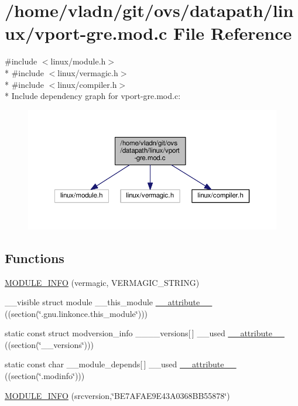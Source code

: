 \hypertarget{vport-gre_8mod_8c}{}\section{/home/vladn/git/ovs/datapath/linux/vport-\/gre.mod.\+c File Reference}
\label{vport-gre_8mod_8c}
{\ttfamily \#include $<$linux/module.\+h$>$}\\*
{\ttfamily \#include $<$linux/vermagic.\+h$>$}\\*
{\ttfamily \#include $<$linux/compiler.\+h$>$}\\*
Include dependency graph for vport-\/gre.mod.\+c\+:
\nopagebreak
\begin{figure}[H]
\begin{center}
\leavevmode
\includegraphics[width=350pt]{vport-gre_8mod_8c__incl}
\end{center}
\end{figure}
\subsection*{Functions}
\begin{DoxyCompactItemize}
\item 
\hyperlink{vport-gre_8mod_8c_a59ae061e50f755cbc9dbde3c6688273a}{M\+O\+D\+U\+L\+E\+\_\+\+I\+N\+F\+O} (vermagic, V\+E\+R\+M\+A\+G\+I\+C\+\_\+\+S\+T\+R\+I\+N\+G)
\item 
\+\_\+\+\_\+visible struct module \+\_\+\+\_\+this\+\_\+module \hyperlink{vport-gre_8mod_8c_acc22bca8fb9ed0433181b5c98efdb5a4}{\+\_\+\+\_\+attribute\+\_\+\+\_\+} ((section(\char`\"{}.gnu.\+linkonce.\+this\+\_\+module\char`\"{})))
\item 
static const struct modversion\+\_\+info \+\_\+\+\_\+\+\_\+\+\_\+versions\mbox{[}$\,$\mbox{]} \+\_\+\+\_\+used \hyperlink{vport-gre_8mod_8c_a3457b560a580904370cd8cbaddb0c902}{\+\_\+\+\_\+attribute\+\_\+\+\_\+} ((section(\char`\"{}\+\_\+\+\_\+versions\char`\"{})))
\item 
static const char \+\_\+\+\_\+module\+\_\+depends\mbox{[}$\,$\mbox{]} \+\_\+\+\_\+used \hyperlink{vport-gre_8mod_8c_aebedc6dfadccd01faf3f462d4fa936f7}{\+\_\+\+\_\+attribute\+\_\+\+\_\+} ((section(\char`\"{}.modinfo\char`\"{})))
\item 
\hyperlink{vport-gre_8mod_8c_aebb251e4779db63aec16f573f4566857}{M\+O\+D\+U\+L\+E\+\_\+\+I\+N\+F\+O} (srcversion,\char`\"{}B\+E7\+A\+F\+A\+E9\+E43\+A0368\+B\+B55878\char`\"{})
\end{DoxyCompactItemize}


